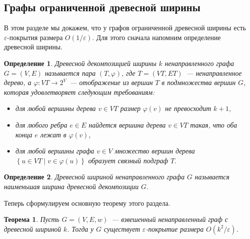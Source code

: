 \documentclass[12pt]{article}
\newcommand{\eps}{\varepsilon}
\newcommand{\set}[1]{\left\{#1\right\}}
\newcommand{\setst}[2]{\set{#1 \mid #2}}
\newtheorem{definition}{Определение}
\newtheorem{theorem}{Теорема}
\begin{document}
    \subsection{Графы ограниченной древесной ширины}
    \label{subsection_bounded_treewidth}
    В этом разделе мы докажем, что у графов ограниченной древесной ширины есть $\eps$-покрытия размера $O(1 / \eps)$.
    Для этого сначала напомним определение древесной ширины.
    \begin{definition}
        \emph{Древесной декомпозицией ширины $k$} ненаправленного графа $G = (V, E)$ называется пара $(T, \varphi)$,
        где $T = (VT, ET)$~--- ненаправленное дерево, а $\varphi \colon VT \to 2^V$~--- отображение из вершин $T$
        в подмножества вершин $G$, которая удовлетворяет следующим требованиям:
        \begin{itemize}
            \item для любой вершины дерева $v \in VT$ размер $\varphi(v)$ не превосходит $k + 1$, 
            \item для любого ребра $e \in E$ найдется вершина дерева $v \in VT$ такая, что оба конца $e$ лежат в $\varphi(v)$,
            \item для любой вершины графа $v \in V$ множество вершин дерева $\setst{u \in VT}{v \in \varphi(u)}$ образует
            связный подграф $T$.
        \end{itemize}
    \end{definition}
    \begin{definition}
        \emph{Древесной шириной} ненаправленного графа $G$ называется наименьшая ширина древесной декомпозиции $G$.
    \end{definition}
    Теперь сформулируем основную теорему этого раздела.
    \begin{theorem}
        Пусть $G = (V, E, w)$~--- взвешенный ненаправленный граф с древесной шириной $k$. Тогда у $G$
        существует $\eps$-покрытие размера $O(k^2 / \eps)$.
    \end{theorem}
\end{document}
